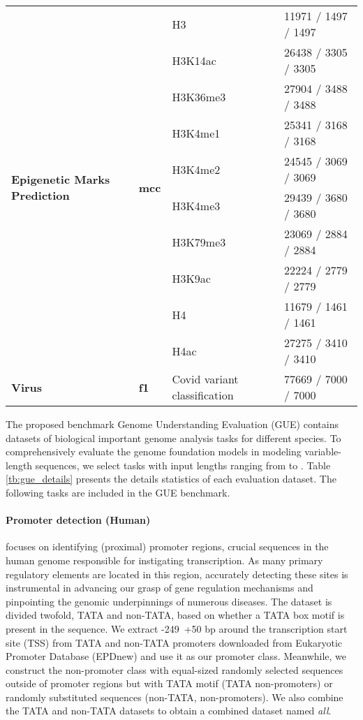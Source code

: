 \documentclass{article}
\begin{document}
\begin{table*}[h]
{\begin{tabular}{llll}
	\midrule

\multirow{10}{*}{\textbf{Epigenetic Marks Prediction}} & \multirow{10}{*}{\textbf{mcc}} 
        & H3  & 11971 / 1497 / 1497 \\
	&& H3K14ac  & 26438 / 3305 / 3305 \\
	&& H3K36me3  & 27904 / 3488 / 3488 \\
        && H3K4me1 & 25341 / 3168 / 3168 \\
        && H3K4me2  & 24545 / 3069 / 3069 \\
        && H3K4me3  & 29439 / 3680 / 3680 \\
	&& H3K79me3  & 23069 / 2884 / 2884 \\
	&& H3K9ac  & 22224 / 2779 / 2779 \\
        && H4 & 11679 / 1461 / 1461 \\
        && H4ac  & 27275 / 3410 / 3410 \\
	
	\midrule

\textbf{Virus}
        & \textbf{f1}
        & Covid variant classification & 77669 / 7000 / 7000 \\
	 

		\bottomrule
	\end{tabular}}
	\caption{ \footnotesize  
		Statistics of tasks in the GUE benchmark, including the name and the number of training, validation, and test samples in each dataset.
	}\label{tb:gue_details}
\end{table*}


The proposed benchmark Genome Understanding Evaluation (GUE) contains  datasets of  biological important genome analysis tasks for  different species. To comprehensively evaluate the genome foundation models in modeling variable-length sequences, we select tasks with input lengths ranging from  to . Table \ref{tb:gue_details} presents the details statistics of each evaluation dataset. The following tasks are included in the GUE benchmark.



\paragraph{Promoter detection (Human)} focuses on identifying (proximal) promoter regions, crucial sequences in the human genome responsible for instigating transcription. As many primary regulatory elements are located in this region, accurately detecting these sites is instrumental in advancing our grasp of gene regulation mechanisms and pinpointing the genomic underpinnings of numerous diseases. The dataset is divided twofold, TATA and non-TATA, based on whether a TATA box motif is present in the sequence. We extract -249~+50 bp around the transcription start site (TSS) from TATA and non-TATA promoters downloaded from Eukaryotic Promoter Database (EPDnew) \citep{dreos2013epd} and use it as our promoter class. Meanwhile, we construct the non-promoter class with equal-sized randomly selected sequences outside of promoter regions but with TATA motif (TATA non-promoters) or randomly substituted sequences (non-TATA, non-promoters). We also combine the TATA and non-TATA datasets to obtain a combined dataset named \textit{all}.
\end{document}
